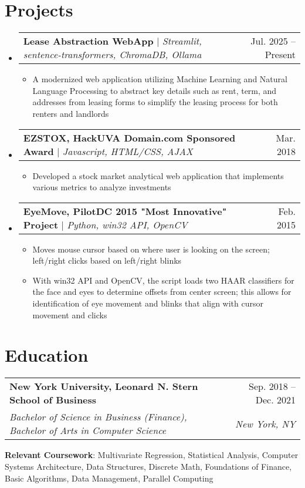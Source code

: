\documentclass[letterpaper,11pt]{article}
\makeatletter
\newcommand{\resumeItem}[1]{
  \item\small{
    {#1 \vspace{-2pt}}
  }
}
\newcommand{\resumeSubheading}[4]{
  \vspace{-2pt}\item
    \begin{tabular*}{0.97\textwidth}[t]{l@{\extracolsep{\fill}}r}
      \textbf{#1} & #2 \\
      \textit{\small#3} & \textit{\small #4} \\
    \end{tabular*}\vspace{-7pt}
}
\newcommand{\resumeProjectHeading}[2]{
    \item
    \begin{tabular*}{0.97\textwidth}{l@{\extracolsep{\fill}}r}
      \small#1 & #2 \\
    \end{tabular*}\vspace{-7pt}
}
\newcommand{\resumeSubHeadingListStart}{\begin{itemize}[leftmargin=0.15in, label={}]}
\newcommand{\resumeSubHeadingListEnd}{\end{itemize}}
\newcommand{\resumeItemListStart}{\begin{itemize}}
\newcommand{\resumeItemListEnd}{\end{itemize}\vspace{-5pt}}
\makeatother
\begin{document}
\section{Projects}
    \resumeSubHeadingListStart
        \resumeProjectHeading
          {\textbf{Lease Abstraction WebApp} $|$ \emph{Streamlit, sentence-transformers, ChromaDB, Ollama}}
          {Jul. 2025 -- Present}
          \resumeItemListStart
            \resumeItem{A modernized web application utilizing Machine Learning and Natural Language Processing to abstract key details such as rent, term, and addresses from leasing forms to simplify the leasing process for both renters and landlords}
          \resumeItemListEnd
        \resumeProjectHeading
          {\textbf{EZSTOX, HackUVA Domain.com Sponsored Award} $|$ \emph{Javascript, HTML/CSS, AJAX}}{Mar. 2018}
          \resumeItemListStart
            \resumeItem{Developed a stock market analytical web application that implements various metrics to analyze investments}
          \resumeItemListEnd
        \resumeProjectHeading
          {\textbf{EyeMove, PilotDC 2015 "Most Innovative" Project} $|$ \emph{Python, win32 API, OpenCV}}{Feb. 2015}
          \resumeItemListStart
            \resumeItem{Moves mouse cursor based on where user is looking on the screen; left/right clicks based on left/right blinks}
            \resumeItem{With win32 API and OpenCV, the script loads two HAAR classifiers for the face and eyes to determine offsets from center screen; this allows for identification of eye movement and blinks that align with cursor movement and clicks}
          \resumeItemListEnd
    \resumeSubHeadingListEnd

\section{Education}
  \resumeSubHeadingListStart
    \resumeSubheading
      {New York University, Leonard N. Stern School of Business}{Sep. 2018 -- Dec. 2021}
      {Bachelor of Science in Business (Finance), Bachelor of Arts in Computer Science}{New York, NY}
    \small{\item{
        \textbf{Relevant Coursework}{: Multivariate Regression, Statistical Analysis, Computer Systems Architecture, Data Structures, Discrete Math, Foundations of Finance, Basic Algorithms, Data Management, Parallel Computing} \\
    }}
  \resumeSubHeadingListEnd

%
\end{document}

